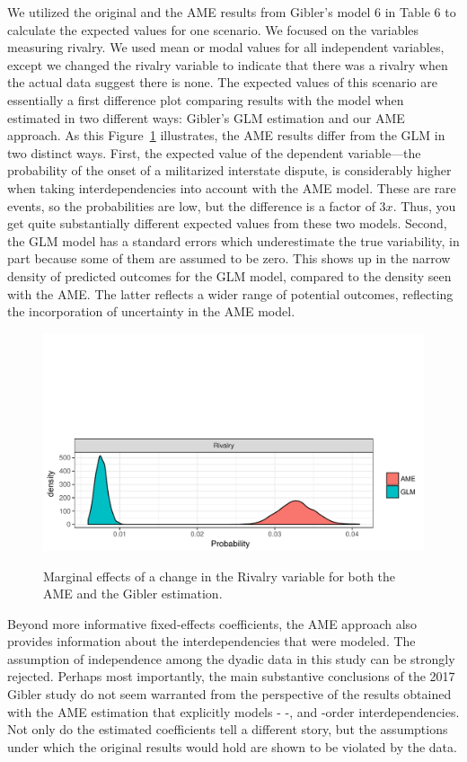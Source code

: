 We utilized the original and the AME results from Gibler's model 6 in Table 6 to calculate the expected values for one scenario. We focused on the variables measuring rivalry.  We used mean or modal values for all independent variables, except we changed the rivalry variable to indicate that there was a rivalry when the actual data suggest there is none.  The expected values of this scenario are essentially a first difference plot comparing results with the model when estimated in two different ways: Gibler's GLM estimation and our AME approach.  As this Figure~\ref{fig:gibmargeff} illustrates, the AME results differ from the GLM in two distinct ways. First, the expected value of the dependent variable---the probability of the onset of a militarized interstate dispute, is considerably higher when taking interdependencies into account with the AME model.  These are rare events, so the probabilities are low, but the difference is a factor of $3x$. Thus, you get quite substantially different expected values from these two models.  Second, the GLM model has a standard errors which underestimate the true variability, in part because some of them are assumed to be zero.  This shows up in the narrow density of predicted outcomes for the GLM model, compared to the density seen with the AME. The latter reflects a wider range of potential outcomes, reflecting the incorporation of uncertainty in the AME model.

\begin{figure}
	\caption{Marginal effects of a change in the Rivalry variable for both the AME and the Gibler estimation.  \label{fig:gibmargeff}}
	\includegraphics[width=\textwidth]{gibler_margeff.pdf}
 	\label{fig:gibmargeff}
 \end{figure}

Beyond more informative fixed-effects coefficients, the AME approach also provides information about the interdependencies that were modeled. The assumption of independence among the dyadic data in this study can be strongly rejected. Perhaps most importantly, the main substantive conclusions of the 2017 Gibler study do not seem warranted from the perspective of the results obtained with the AME estimation that explicitly models \first- \second-, and \third-order interdependencies. Not only do the estimated coefficients tell a different story, but the assumptions under which the original results would hold are shown to be violated by the data.

